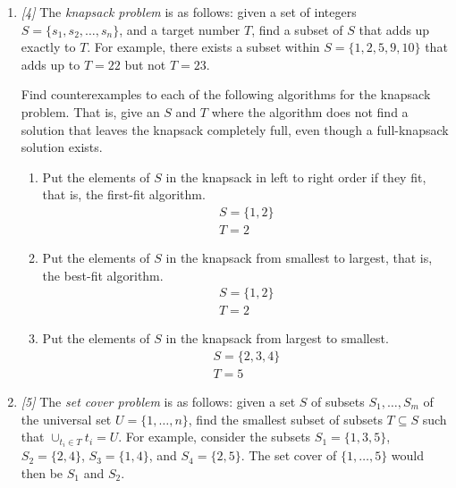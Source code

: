 \documentclass[10pt, letterpaper]{article}
\begin{document}
\begin{enumerate}
        \item \textit{[4]} The \textit{knapsack problem} is as follows: given a set of integers
        $S = \{s_1, s_2, \ldots, s_n\}$, and a target number $T$, find a subset of $S$ that adds up
        exactly to $T$. For example, there exists a subset within $S = \{1, 2, 5, 9, 10\}$ that adds
        up to $T = 22$ but not $T = 23$.

        Find counterexamples to each of the following algorithms for the knapsack problem. That is,
        give an $S$ and $T$ where the algorithm does not find a solution that leaves the knapsack
        completely full, even though a full-knapsack solution exists.

        \begin{enumerate}
            \item Put the elements of $S$ in the knapsack in left to right order if they fit, that
            is, the first-fit algorithm.
            \begin{gather*}
                S = \{1, 2\} \\
                T = 2
            \end{gather*}

            \item Put the elements of $S$ in the knapsack from smallest to largest, that is, the
            best-fit algorithm.
            \begin{gather*}
                S = \{1, 2\} \\
                T = 2
            \end{gather*}

            \item Put the elements of $S$ in the knapsack from largest to smallest.
            \begin{gather*}
                S = \{2, 3, 4\} \\
                T = 5
            \end{gather*}
        \end{enumerate}

        \item \textit{[5]} The \textit{set cover problem} is as follows: given a set $S$ of subsets
        $S_1, \ldots, S_m$ of the universal set $U = \{1, \ldots, n\}$, find the smallest subset of
        subsets $T \subseteq S$ such that $\cup_{t_i \in T} t_i = U$. For example, consider the
        subsets $S_1 = \{1, 3, 5\}$, $S_2 = \{2, 4\}$, ${S_3 = \{1, 4\}}$, and $S_4 = \{2, 5\}$. The
        set cover of $\{1, \ldots, 5\}$ would then be $S_1$ and $S_2$.


\end{enumerate}
\end{document}

